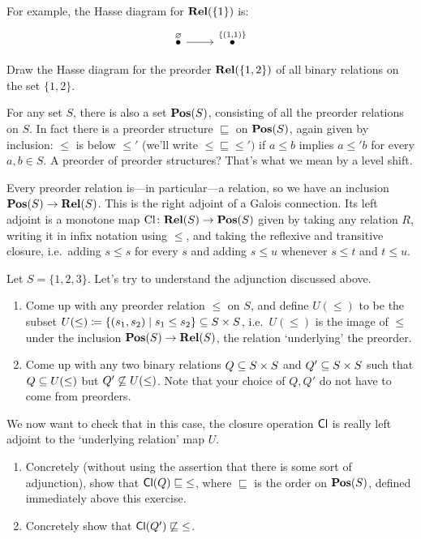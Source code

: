 \documentclass[7Sketches]{subfiles}
\begin{document}
For example, the Hasse diagram for $\Cat{Rel}(\{1\})$ is:
\[
\begin{tikzcd}
	\LMO{\varnothing}\ar[r]& 	\LMO{\{(1,1)\}}
\end{tikzcd}
\]
%

\begin{exercise}%
\label{exc.Hasse_binary12}
Draw the Hasse diagram for the preorder $\Cat{Rel}(\{1,2\})$ of all binary relations on the set $\{1,2\}$.
\end{exercise}

For any set $S$, there is also a set $\Cat{Pos}(S)$,
consisting of all the preorder relations on $S$. In fact there is a preorder
structure $\sqsubseteq$%
\label{page.order_preorder} on $\Cat{Pos}(S)$, again given by inclusion: $\leq$
is below $\leq'$ (we'll write $\leq\sqsubseteq\leq')$ if $a\leq b$ implies $a\leq' b$ for every $a,b\in S$. A preorder of preorder structures? That's what we mean by a level shift.

Every preorder relation is---in particular---a relation, so we have an inclusion
$\Cat{Pos}(S)\to\Cat{Rel}(S)$. This is the right adjoint of a Galois connection.%
Its left adjoint is a monotone map
$\mathrm{Cl}\colon\Cat{Rel}(S)\to\Cat{Pos}(S)$ given by taking any relation $R$, writing it in infix notation using $\leq$, and
taking the reflexive and transitive closure, i.e.\ adding $s\leq s$ for every
$s$ and adding $s\leq u$ whenever $s\leq t$ and $t\leq u$.%

\begin{exercise}%
\label{exc.understand_adj}%
	Let $S=\{1,2,3\}$. Let's try to understand the adjunction discussed above.
	\begin{enumerate}
		\item Come up with any preorder relation $\leq$ on $S$, and define $U(\leq)$ to be the subset $U(\leq)\coloneqq\{(s_1,s_2)\mid s_1\leq s_2\}\ss S\times S$, i.e.\ $U(\leq)$ is the image of $\leq$ under the inclusion $\Cat{Pos}(S)\to\Cat{Rel}(S)$, the relation `underlying' the preorder.
		\item Come up with any two binary relations $Q\ss S\times S$ and $Q'\ss S\times S$ such that $Q\ss U(\leq)$ but $Q'\not\ss U(\leq)$. Note that your choice of $Q,Q'$ do not have to come from preorders.
	\end{enumerate}
	We now want to check that in this case, the closure operation $\Fun{Cl}$ is really left adjoint to the `underlying relation' map $U$.
	\begin{enumerate}[resume]
		\item Concretely (without using the assertion that there is some sort of adjunction), show that $\Fun{Cl}(Q)\sqsubseteq\;\leq$, where $\sqsubseteq$ is the order on $\Cat{Pos}(S)$, defined immediately above this exercise.
		\item Concretely show that $\Fun{Cl}(Q')\not\sqsubseteq\;\leq$.
	\qedhere
\end{enumerate}
\end{exercise}
\end{document}
